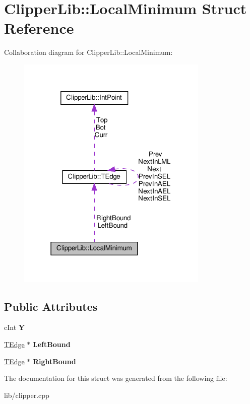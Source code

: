 \hypertarget{struct_clipper_lib_1_1_local_minimum}{}\section{Clipper\+Lib\+:\+:Local\+Minimum Struct Reference}
\label{struct_clipper_lib_1_1_local_minimum}


Collaboration diagram for Clipper\+Lib\+:\+:Local\+Minimum\+:
\nopagebreak
\begin{figure}[H]
\begin{center}
\leavevmode
\includegraphics[width=259pt]{struct_clipper_lib_1_1_local_minimum__coll__graph}
\end{center}
\end{figure}
\subsection*{Public Attributes}
\begin{DoxyCompactItemize}
\item 
\mbox{\label{struct_clipper_lib_1_1_local_minimum_a71836a7c572ddfcf8853accb7314b7cf}} 
c\+Int {\bfseries Y}
\item 
\mbox{\label{struct_clipper_lib_1_1_local_minimum_a0e7b997adca472b6e80f3223c45965ea}} 
\hyperlink{struct_clipper_lib_1_1_t_edge}{T\+Edge} $\ast$ {\bfseries Left\+Bound}
\item 
\mbox{\label{struct_clipper_lib_1_1_local_minimum_ade212cfb8c35da168b2bf20ad3e0ac94}} 
\hyperlink{struct_clipper_lib_1_1_t_edge}{T\+Edge} $\ast$ {\bfseries Right\+Bound}
\end{DoxyCompactItemize}


The documentation for this struct was generated from the following file\+:\begin{DoxyCompactItemize}
\item 
lib/clipper.\+cpp\end{DoxyCompactItemize}
